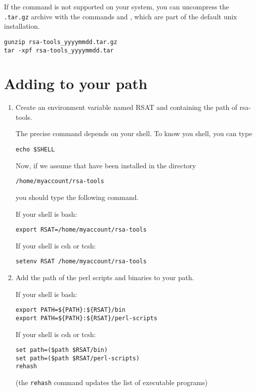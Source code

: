 \documentclass{article}
\begin{document}
If the  command is not supported on your system, you
can uncompress the \texttt{.tar.gz} archive with the commands
 and , which are part of the default unix
installation.

\begin{verbatim}
gunzip rsa-tools_yyyymmdd.tar.gz
tar -xpf rsa-tools_yyyymmdd.tar
\end{verbatim}

\section{Adding \RSAT to your path}

\begin{enumerate}

\item Create an environment variable named RSAT and containing the
  path of rsa-tools. 

The precise command depends on your shell. To know you shell, you can
type
\begin{verbatim}
echo $SHELL
\end{verbatim}

Now, if we assume that \RSAT have been installed in the directory

\begin{verbatim}
/home/myaccount/rsa-tools
\end{verbatim}

you should type the following command.

If your shell is bash:
\begin{verbatim}
export RSAT=/home/myaccount/rsa-tools
\end{verbatim}

If your shell is csh or tcsh:
\begin{verbatim}
setenv RSAT /home/myaccount/rsa-tools
\end{verbatim}



\item Add the path of the \RSAT perl scripts and binaries to your
  path.

If your shell is bash:
\begin{verbatim}
export PATH=${PATH}:${RSAT}/bin
export PATH=${PATH}:${RSAT}/perl-scripts
\end{verbatim}

If your shell is csh or tcsh:
\begin{verbatim}
set path=($path $RSAT/bin)
set path=($path $RSAT/perl-scripts)
rehash
\end{verbatim}

(the \texttt{rehash} command updates the list of executable programs)

\end{enumerate}
\end{document}

